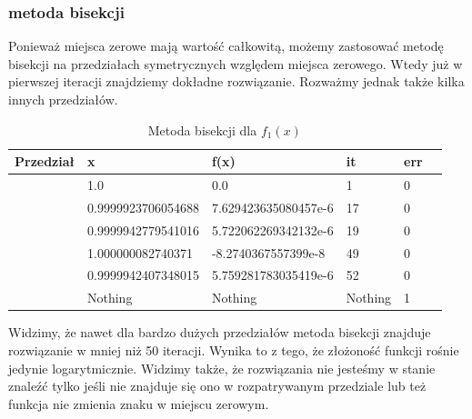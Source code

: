 \documentclass{article}
\begin{document}
\subsubsection*{metoda bisekcji}
Ponieważ miejsca zerowe mają wartość całkowitą, możemy
zastosować metodę bisekcji na przedziałach symetrycznych
względem miejsca zerowego. Wtedy już w pierwszej iteracji
znajdziemy dokładne rozwiązanie. Rozważmy jednak także kilka
innych przedziałów.
\begin{table}[H]
\centering
\begin{tabular}{|l|l|l|l|l|l|}
\hline
\textbf{Przedział}                     & \textbf{x}                    & \textbf{f(x)}                    & \textbf{it} & \textbf{err} \\ \hline
[0.0, 2.0]                            & 1.0                           & 0.0                              & 1           & 0            \\ \hline
[0.0, 1.0]                            & 0.9999923706054688            & 7.629423635080457e-6             & 17          & 0            \\ \hline
[-2.0, 1.0]                           & 0.9999942779541016            & 5.722062269342132e-6             & 19          & 0            \\ \hline
[0.0, 1.0e10]                         & 1.000000082740371             & -8.2740367557399e-8              & 49          & 0            \\ \hline
[$-11^{10}$, 1.0]               & 0.9999942407348015            & 5.759281783035419e-6             & 52          & 0            \\ \hline
[2.0, 3.0]                            & Nothing                       & Nothing                          & Nothing     & 1            \\ \hline
\end{tabular}
\caption{Metoda bisekcji dla \( f_1(x) \)}
\end{table}
Widzimy, że nawet dla bardzo dużych przedziałów metoda bisekcji
znajduje rozwiązanie w mniej niż 50 iteracji. Wynika to z tego,
że złożoność funkcji rośnie jedynie logarytmicznie. Widzimy także, że
rozwiązania nie jesteśmy w stanie znaleźć tylko jeśli nie znajduje
się ono w rozpatrywanym przedziale lub też funkcja nie zmienia
znaku w miejscu zerowym.
  
\end{document}
